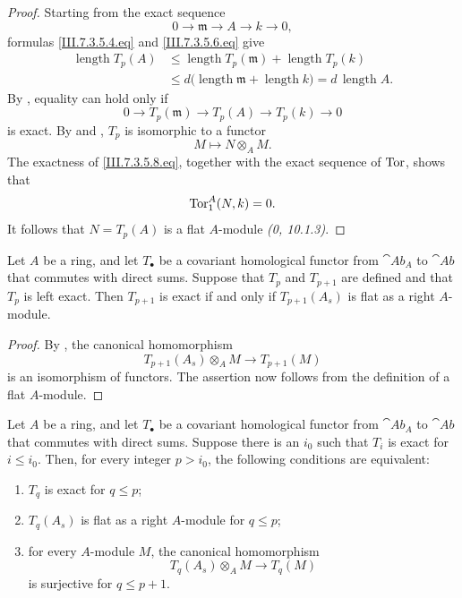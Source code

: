 \begin{proof}
Starting from the exact sequence
\[
  0\longrightarrow\mathfrak m
  \longrightarrow A
  \longrightarrow k
  \longrightarrow0,
\]
formulas \eqref{III.7.3.5.4.eq} and
\eqref{III.7.3.5.6.eq} give
\[
  \begin{split}
  \operatorname{length}T_p(A)
  &\leq
  \operatorname{length}T_p(\mathfrak m)
  +
  \operatorname{length}T_p(k)
  \\
  &\leq
  d\bigl(
    \operatorname{length}\mathfrak m
    +
    \operatorname{length}k
  \bigr)
  =
  d\,\operatorname{length}A.
  \end{split}
\]
By , equality can hold only if
\[
  0\longrightarrow T_p(\mathfrak m)
  \longrightarrow T_p(A)
  \longrightarrow T_p(k)
  \longrightarrow0
  \tag{7.3.5.8}\label{III.7.3.5.8.eq}
\]
is exact.  By  and , $T_p$ is
isomorphic to a functor
\[
  M\longmapsto N\otimes_A M.
\]
The exactness of \eqref{III.7.3.5.8.eq}, together with the exact
sequence of $\operatorname{Tor}$, shows that
\[
  \operatorname{Tor}^A_1(N,k)=0.
\]
It follows that $N=T_p(A)$ is a flat $A$-module
\emph{(0, 10.1.3)}.
\end{proof}

\begin{lemma}[7.3.6]
\label{III.7.3.6}
Let $A$ be a ring, and let $T_\bullet$ be a covariant
homological functor from $\cat{Ab}_A$ to $\cat{Ab}$ that
commutes with direct sums.  Suppose that $T_p$ and $T_{p+1}$
are defined and that $T_p$ is left exact.  Then $T_{p+1}$ is
exact if and only if $T_{p+1}(A_s)$ is flat as a right
$A$-module.
\end{lemma}

\begin{proof}
By , the canonical homomorphism
\[
  T_{p+1}(A_s)\otimes_A M
  \longrightarrow
  T_{p+1}(M)
\]
is an isomorphism of functors.  The assertion now follows from
the definition of a flat $A$-module.
\end{proof}

\begin{proposition}[7.3.7]
\label{III.7.3.7}
Let $A$ be a ring, and let $T_\bullet$ be a covariant
homological functor from $\cat{Ab}_A$ to $\cat{Ab}$ that
commutes with direct sums.  Suppose there is an $i_0$ such that
$T_i$ is exact for $i\leq i_0$.  Then, for every integer
$p>i_0$, the following conditions are equivalent:
\begin{enumerate}
  \item[(a)] $T_q$ is exact for $q\leq p$;
  \item[(b)] $T_q(A_s)$ is flat as a right $A$-module for
    $q\leq p$;
  \item[(c)] for every $A$-module $M$, the canonical
    homomorphism
    \[
      T_q(A_s)\otimes_A M
      \longrightarrow
      T_q(M)
    \]
    is surjective for $q\leq p+1$.
\end{enumerate}
\end{proposition}

